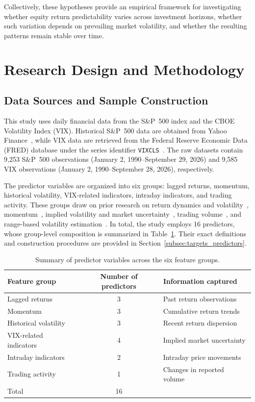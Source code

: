 \documentclass[12pt,twoside]{ord}
\begin{document}
Collectively, these hypotheses provide an empirical framework for investigating whether equity return predictability varies across investment horizons, whether such variation depends on prevailing market volatility, and whether the resulting patterns remain stable over time.


\section{Research Design and Methodology}\label{sec:data}

\subsection{Data Sources and Sample Construction}\label{subsec:data_sources}

This study uses daily financial data from the S\&P~500 index and the CBOE Volatility Index (VIX). Historical S\&P~500 data are obtained from Yahoo Finance~\cite{yahoosandp}, while VIX data are retrieved from the Federal Reserve Economic Data (FRED) database under the series identifier \texttt{VIXCLS}~\cite{fredvix}. The raw datasets contain 9,253 S\&P~500 observations (January 2, 1990--September 29, 2026) and 9,585 VIX observations (January 2, 1990--September 28, 2026), respectively.

The predictor variables are organized into six groups: lagged returns, momentum, historical volatility, VIX-related indicators, intraday indicators, and trading activity. These groups draw on prior research on return dynamics and volatility~\cite{french1987}, momentum~\cite{jegadeesh1993}, implied volatility and market uncertainty~\cite{banerjee2007,bekaert2014}, trading volume~\cite{campbell1993}, and range-based volatility estimation~\cite{alizadeh2002}. In total, the study employs 16 predictors, whose group-level composition is summarized in Table~\ref{tab:predictors}. Their exact definitions and construction procedures are provided in Section~\ref{subsec:targets_predictors}.

\begin{table}[htbp]
\caption{Summary of predictor variables across the six feature groups.}\label{tab:predictors}
\centering
\begin{tabular}{lcl}
\hline
Feature group & Number of predictors & Information captured \\
\hline
Lagged returns & 3 & Past return observations \\
Momentum & 3 & Cumulative return trends \\
Historical volatility & 3 & Recent return dispersion \\
VIX-related indicators & 4 & Implied market uncertainty \\
Intraday indicators & 2 & Intraday price movements \\
Trading activity & 1 & Changes in reported volume \\
\hline
Total & 16 & \\
\hline
\end{tabular}
\end{table}
\end{document}
